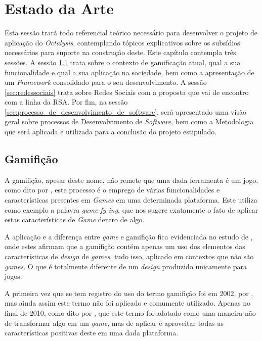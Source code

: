 \chapter[Estado da Arte]{Estado da Arte}
Esta sessão trará todo referencial teórico necessário para desenvolver o projeto
de aplicação do \textit{Octalysis}, contemplando tópicos explicativos sobre os subsídios
necessários para suporte na construção deste. Este capítulo contempla três sessões.
A sessão \ref{sec:gamifição} trata sobre o contexto de gamificação atual, qual a
sua funcionalidade e qual a sua aplicação na sociedade, bem como a apresentação
de um \textit{Framework} consolidado para o seu desenvolvimento. A sessão \ref{sec:redessociais}
trata sobre Redes Sociais com a proposta que vai de encontro com a linha da RSA.
Por fim, na sessão \ref{sec:processo_de_desenvolvimento_de_software},
será apresentado uma visão geral sobre processos de
Desenvolvimento de \textit{Software}, bem como a Metodologia que será aplicada e utilizada
para a conclusão do projeto estipulado.

\section{Gamifição}
\label{sec:gamifição}
A gamifição, apesar deste nome, não remete que uma dada ferramenta é um jogo,
como dito por \cite{popularitygamification}, este processo é o emprego de
várias funcionalidades e características presentes em \textit{Games} em uma determinada
plataforma. Este utiliza como exemplo a palavra \textit{game-fy-ing}, que nos sugere
exatamente o fato de aplicar estas características de \textit{Game} dentro de algo.

A aplicação e a diferença entre \textit{game} e gamifição fica evidenciada
no estudo de \cite{deterding2011gamification}, onde estes afirmam que a gamifição contém  apenas
um uso dos elementos das características de \textit{design} de \textit{games}, tudo isso,
aplicado em contextos que não são \textit{games}. O que é totalmente diferente
de um \textit{design} produzido unicamente para jogos.

A primeira vez que se tem registro do uso do termo gamifição foi em 2002,
por \cite{pelling}, mas ainda assim este termo não foi aplicado e comumente
utilizado. Apenas no final de 2010, como dito por \cite{deterding2011gamification}, que
este termo foi adotado como uma maneira não de transformar algo em um \textit{game},
mas de aplicar e aproveitar todas as características positivas deste em uma dada
plataforma.

